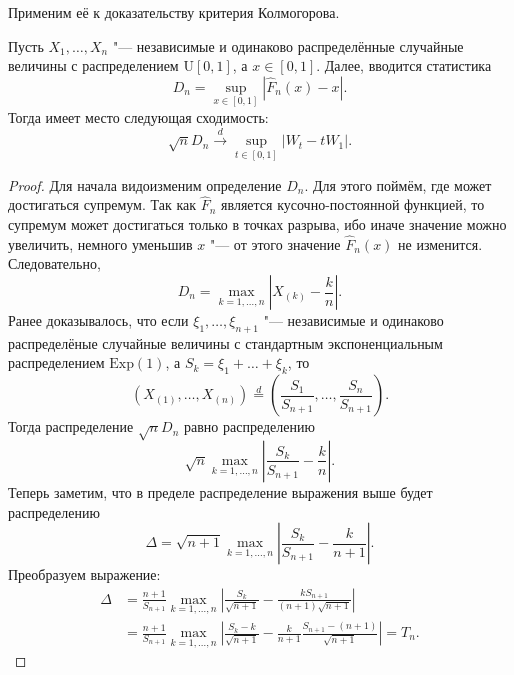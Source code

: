 Применим её к доказательству критерия Колмогорова. 
\begin{theorem}
	Пусть $X_{1}, \ldots, X_{n}$ "--- независимые и одинаково распределённые случайные величины с распределением $\mathrm{U}[0, 1]$, а $x \in [0, 1]$. Далее, вводится статистика
	\begin{equation}
		D_{n} = \sup_{x \in [0, 1]} |\hat{F}_{n}(x) - x|.
	\end{equation}
	Тогда имеет место следующая сходимость:
	\begin{equation}
		\sqrt{n}D_{n} \xrightarrow{d} \sup_{t \in [0, 1]}|W_{t} - tW_{1}|.
	\end{equation} 
\end{theorem}
\begin{proof}
	Для начала видоизменим определение $D_{n}$. Для этого поймём, где может достигаться супремум. Так как $\hat{F}_{n}$ является кусочно-постоянной функцией, то супремум может достигаться только в точках разрыва, ибо иначе значение можно увеличить, немного уменьшив $x$ "--- от этого значение $\hat{F}_{n}(x)$ не изменится. Следовательно,
	\begin{equation}
		D_{n} = \max_{k = 1, \ldots, n}\left|X_{(k)} - \frac{k}{n}\right|.
	\end{equation}
	Ранее доказывалось, что если $\xi_{1}, \ldots, \xi_{n + 1}$ "--- независимые и одинаково распределёные случайные величины с стандартным экспоненциальным распределением $\mathrm{Exp}(1)$, а $S_{k} = \xi_{1} + \ldots + \xi_{k}$, то
	\begin{equation}
		(X_{(1)}, \ldots, X_{(n)}) \stackrel{d}{=} \left(\frac{S_{1}}{S_{n + 1}}, \ldots, \frac{S_{n}}{S_{n + 1}}\right).
	\end{equation}
	Тогда распределение $\sqrt{n}D_{n}$ равно распределению
	\begin{equation}
		\sqrt{n}\max_{k = 1, \ldots, n}\left|\frac{S_{k}}{S_{n + 1}} - \frac{k}{n}\right|.
	\end{equation}
	Теперь заметим, что в пределе распределение выражения выше будет распределению 
	\begin{equation}
		\Delta = \sqrt{n + 1}\max_{k = 1, \ldots, n}\left|\frac{S_{k}}{S_{n + 1}} - \frac{k}{n + 1}\right|.
	\end{equation}
	Преобразуем выражение:
	\begin{align}
		\Delta
		&= \frac{n + 1}{S_{n + 1}}\max_{k = 1, \ldots, n}\left|\frac{S_{k}}{\sqrt{n + 1}} - \frac{kS_{n + 1}}{(n + 1)\sqrt{n + 1}}\right| \\
		&= \frac{n + 1}{S_{n + 1}}\max_{k = 1, \ldots, n}\left|\frac{S_{k} - k}{\sqrt{n + 1}} - \frac{k}{n + 1}\frac{S_{n + 1} - (n + 1)}{\sqrt{n + 1}}\right| = T_{n}.

\end{align}
\end{proof}
